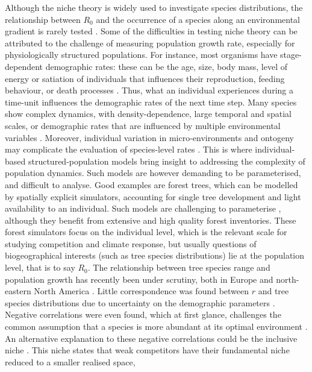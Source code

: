 Although the niche theory is widely used to investigate species distributions,
the relationship between $ R_0 $ and the occurrence of a species along an
environmental gradient is rarely tested \citep{McGill2012}. Some of the
difficulties in testing niche theory can be attributed to the challenge of
measuring population growth rate, especially for physiologically structured
populations. For instance, most organisms have stage-dependent demographic
rates: these can be the age, size, body mass, level of energy or satiation of
individuals that influences their reproduction, feeding behaviour, or death
processes \citep[and references therein]{DeRoos1997}. Thus, what an individual experiences during
a time-unit influences the demographic rates of the next time step. Many
species show complex dynamics, with density-dependence, large temporal and
spatial scales, or demographic rates that are influenced by multiple
environmental variables \citep{DeRoos1997}. Moreover, individual variation in
micro-environments and ontogeny may complicate the evaluation of species-level
rates \citep{Clark2011}. This is where individual-based structured-population
models bring insight to addressing the complexity of population dynamics.
Such models are however demanding to be parameterised, and difficult to
analyse. Good examples are forest trees, which can be modelled by spatially
explicit simulators, accounting for single tree development and light
availability to an individual. Such models are challenging to parameterise \citep{Pacala1996},
although they benefit from extensive and high quality forest inventories.
These forest simulators focus on the individual level, which is the relevant
scale for studying competition and climate response, but usually questions of
biogeographical interests (such as tree species distributions) lie at the
population level, that is to say $ R_0 $. The relationship between tree
species range and population growth has recently been under scrutiny, both in
Europe \citep{Thuiller2014} and north-eastern North America
\citep{McGill2012}. Little correspondence was found between $ r $ and
tree species distributions due to uncertainty on the demographic parameters \citep{Thuiller2014}. Negative
correlations were even found, which at first glance, challenges the common
assumption that a species is more abundant at its optimal environment
\citep{McGill2012}. An alternative explanation to these negative correlations
could be the inclusive niche \citep{McGill2012}. This niche states that weak
competitors have their fundamental niche reduced to a smaller realised space,
